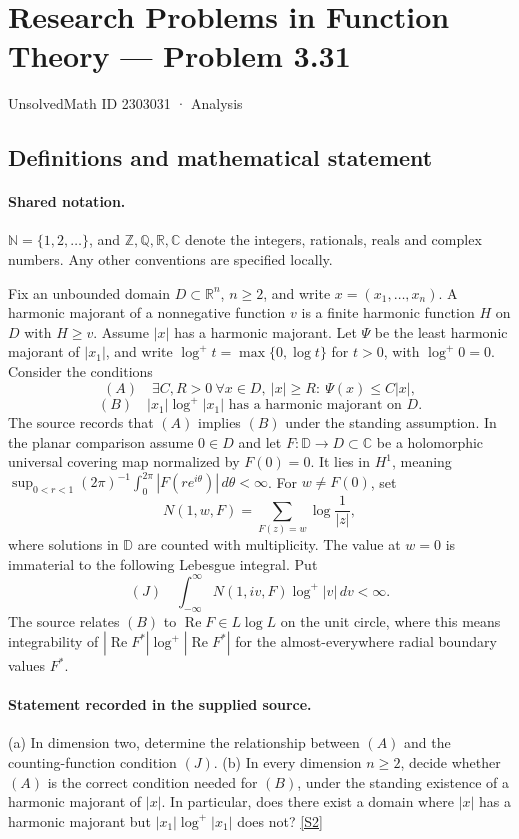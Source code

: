 \documentclass[11pt]{book}
\newcommand{\sref}[2]{\hyperlink{source:#1:#2}{[S#2]}}
\begin{document}
\setcounter{section}{2303030}
\section{Research Problems in Function Theory — Problem 3.31}\label{2303031}
{\small\sffamily UnsolvedMath ID 2303031 · Analysis}
\subsection{Definitions and mathematical statement}

\paragraph{Shared notation.}$\mathbb N=\{1,2,\ldots\}$, and $\mathbb Z,\mathbb Q,\mathbb R,\mathbb C$ denote the integers, rationals, reals and complex numbers. Any other conventions are specified locally.


Fix an unbounded domain $D\subset\mathbb R^n$, $n\ge2$, and write $x=(x_1,\ldots,x_n)$. A harmonic majorant of a nonnegative function $v$ is a finite harmonic function $H$ on $D$ with $H\ge v$. Assume $|x|$ has a harmonic majorant. Let $\Psi$ be the least harmonic majorant of $|x_1|$, and write $\log^+t=\max\{0,\log t\}$ for $t>0$, with $\log^+0=0$. Consider the conditions
\[
 (A)\quad\exists C,R>0\ \forall x\in D,\ |x|\ge R:\ \Psi(x)\le C|x|,
\]
\[
 (B)\quad |x_1|\log^+|x_1|\text{ has a harmonic majorant on }D.
\]
The source records that $(A)$ implies $(B)$ under the standing assumption. In the planar comparison assume $0\in D$ and let $F:\mathbb D\to D\subset\mathbb C$ be a holomorphic universal covering map normalized by $F(0)=0$. It lies in $H^1$, meaning $\sup_{0<r<1}(2\pi)^{-1}\int_0^{2\pi}|F(re^{i\theta})|\,d\theta<\infty$. For $w\ne F(0)$, set
\[N(1,w,F)=\sum_{F(z)=w}\log\frac1{|z|},\]
where solutions in $\mathbb D$ are counted with multiplicity. The value at $w=0$ is immaterial to the following Lebesgue integral. Put
\[
 (J)\quad\int_{-\infty}^{\infty}N(1,iv,F)\log^+|v|\,dv<\infty.
\]
The source relates $(B)$ to $\operatorname{Re}F\in L\log L$ on the unit circle, where this means integrability of $|\operatorname{Re}F^*|\log^+|\operatorname{Re}F^*|$ for the almost-everywhere radial boundary values $F^*$.
\paragraph{Statement recorded in the supplied source.}
(a) In dimension two, determine the relationship between $(A)$ and the counting-function condition $(J)$.
(b) In every dimension $n\ge2$, decide whether $(A)$ is the correct condition needed for $(B)$, under the standing existence of a harmonic majorant of $|x|$. In particular, does there exist a domain where $|x|$ has a harmonic majorant but $|x_1|\log^+|x_1|$ does not? \sref{2303031}{2}
\end{document}

